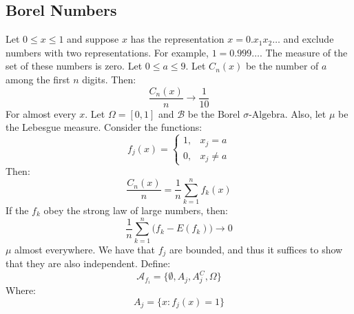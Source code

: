             \subsection{Borel Numbers}
                Let $0\leq{x}\leq{1}$ and suppose $x$ has the
                representation $x=0.x_{1}x_{2}\dots$ and exclude
                numbers with two representations. For example,
                $1=0.999\dots$. The measure of the set of these numbers
                is zero. Let $0\leq{a}\leq{9}$. Let $C_{n}(x)$ be
                the number of $a$ among the first $n$ digits. Then:
                \begin{equation}
                    \frac{C_{n}(x)}{n}\rightarrow\frac{1}{10}
                \end{equation}
                For almost every $x$. Let $\Omega=[0,1]$ and
                $\mathcal{B}$ be the Borel $\sigma\textrm{-Algebra}$.
                Also, let $\mu$ be the Lebesgue measure. Consider
                the functions:
                \begin{equation}
                    f_{j}(x)=
                    \begin{cases}
                        1,&x_{j}=a\\
                        0,&x_{j}\ne{a}
                    \end{cases}
                \end{equation}
                Then:
                \begin{equation}
                    \frac{C_{n}(x)}{n}=\frac{1}{n}\sum_{k=1}^{n}
                        f_{k}(x)
                \end{equation}
                If the $f_{k}$ obey the strong law of large numbers,
                then:
                \begin{equation}
                    \frac{1}{n}\sum_{k=1}^{n}\big(f_{k}-E(f_{k})\big)
                    \rightarrow{0}
                \end{equation}
                $\mu$ almost everywhere. We have that $f_{j}$ are
                bounded, and thus it suffices to show that they are
                also independent. Define:
                \begin{equation}
                    \mathcal{A}_{f_{i}}=
                    \{\emptyset,A_{j},A_{j}^{C},\Omega\}
                \end{equation}
                Where:
                \begin{equation}
                    A_{j}=\{x:f_{j}(x)=1\}
                \end{equation}
